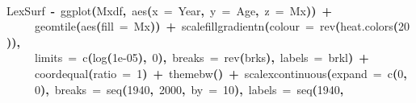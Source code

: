 \documentclass[a4paper]{article}
\newcommand{\hlnumber}[1]{\textcolor[rgb]{0.0823529411764706,0.0784313725490196,0.709803921568627}{#1}}%
\newcommand{\hlfunctioncall}[1]{\textcolor[rgb]{1,0,0}{#1}}%
\newcommand{\hlkeyword}[1]{\textcolor[rgb]{0,0,0}{\textbf{#1}}}%
\newcommand{\hlargument}[1]{\textcolor[rgb]{0.694117647058824,0.247058823529412,0.0196078431372549}{#1}}%
\newcommand{\hlassignement}[1]{\textcolor[rgb]{0.215686274509804,0.215686274509804,0.384313725490196}{\textbf{#1}}}%
\newcommand{\hlsymbol}[1]{\textcolor[rgb]{0,0,0}{#1}}%
\newcommand{\hlprompt}[1]{\textcolor[rgb]{0,0,0}{#1}}%
\newcommand{\hlstd}[1]{\textcolor[rgb]{0,0,0}{#1}}%
\newenvironment{Houtput}{\raggedright}{%
%
}
\begin{document}
\begin{Houtput}
\hspace*{\fill}\\
\hlstd{}\ttfamily\noindent
\hlprompt{\usebox{\hlnormalsizeboxgreaterthan}{\ }}\hlsymbol{LexSurf}{\ }\hlassignement{\usebox{\hlnormalsizeboxlessthan}-}{\ }\hlfunctioncall{ggplot}\hlkeyword{(}\hlsymbol{Mxdf}\hlkeyword{,}{\ }\hlfunctioncall{aes}\hlkeyword{(}\hlargument{x}{\ }\hlargument{=}{\ }\hlsymbol{Year}\hlkeyword{,}{\ }\hlargument{y}{\ }\hlargument{=}{\ }\hlsymbol{Age}\hlkeyword{,}{\ }\hlargument{z}{\ }\hlargument{=}{\ }\hlsymbol{Mx}\hlkeyword{)}\hlkeyword{)}{\ }\hlkeyword{+}\hspace*{\fill}\\
\hlstd{}\hlprompt{{\ }}{\ }{\ }{\ }{\ }\hlfunctioncall{geom\usebox{\hlnormalsizeboxunderscore}tile}\hlkeyword{(}\hlfunctioncall{aes}\hlkeyword{(}\hlargument{fill}{\ }\hlargument{=}{\ }\hlsymbol{Mx}\hlkeyword{)}\hlkeyword{)}{\ }\hlkeyword{+}{\ }\hlfunctioncall{scale\usebox{\hlnormalsizeboxunderscore}fill\usebox{\hlnormalsizeboxunderscore}gradientn}\hlkeyword{(}\hlargument{colour}{\ }\hlargument{=}{\ }\hlfunctioncall{rev}\hlkeyword{(}\hlfunctioncall{heat.colors}\hlkeyword{(}\hlnumber{20}\hlkeyword{)}\hlkeyword{)}\hlkeyword{,}\hspace*{\fill}\\
\hlstd{}\hlprompt{{\ }}{\ }{\ }{\ }{\ }\hlargument{limits}{\ }\hlargument{=}{\ }\hlfunctioncall{c}\hlkeyword{(}\hlfunctioncall{log}\hlkeyword{(}\hlnumber{1e-05}\hlkeyword{)}\hlkeyword{,}{\ }\hlnumber{0}\hlkeyword{)}\hlkeyword{,}{\ }\hlargument{breaks}{\ }\hlargument{=}{\ }\hlfunctioncall{rev}\hlkeyword{(}\hlsymbol{brks}\hlkeyword{)}\hlkeyword{,}{\ }\hlargument{labels}{\ }\hlargument{=}{\ }\hlsymbol{brkl}\hlkeyword{)}{\ }\hlkeyword{+}\hspace*{\fill}\\
\hlstd{}\hlprompt{{\ }}{\ }{\ }{\ }{\ }\hlfunctioncall{coord\usebox{\hlnormalsizeboxunderscore}equal}\hlkeyword{(}\hlargument{ratio}{\ }\hlargument{=}{\ }\hlnumber{1}\hlkeyword{)}{\ }\hlkeyword{+}{\ }\hlfunctioncall{theme\usebox{\hlnormalsizeboxunderscore}bw}\hlkeyword{(}\hlkeyword{)}{\ }\hlkeyword{+}{\ }\hlfunctioncall{scale\usebox{\hlnormalsizeboxunderscore}x\usebox{\hlnormalsizeboxunderscore}continuous}\hlkeyword{(}\hlargument{expand}{\ }\hlargument{=}{\ }\hlfunctioncall{c}\hlkeyword{(}\hlnumber{0}\hlkeyword{,}\hspace*{\fill}\\
\hlstd{}\hlprompt{{\ }}{\ }{\ }{\ }{\ }\hlnumber{0}\hlkeyword{)}\hlkeyword{,}{\ }\hlargument{breaks}{\ }\hlargument{=}{\ }\hlfunctioncall{seq}\hlkeyword{(}\hlnumber{1940}\hlkeyword{,}{\ }\hlnumber{2000}\hlkeyword{,}{\ }\hlargument{by}{\ }\hlargument{=}{\ }\hlnumber{10}\hlkeyword{)}\hlkeyword{,}{\ }\hlargument{labels}{\ }\hlargument{=}{\ }\hlfunctioncall{seq}\hlkeyword{(}\hlnumber{1940}\hlkeyword{,}\hspace*{\fill}\\

\end{Houtput}
\end{document}

